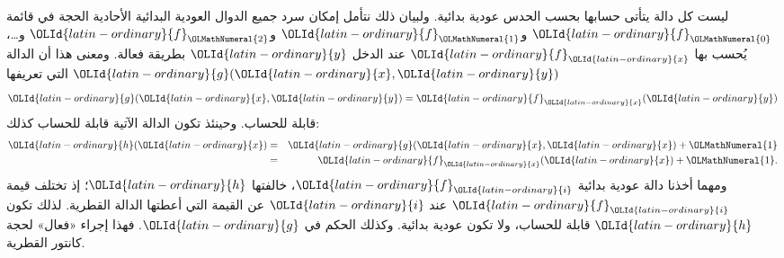\documentclass[../../../include/open-logic-section]{subfiles}
\begin{document}

ليست كل دالة يتأتى حسابها بحسب
الحدس عودية بدائية. ولبيان ذلك نتأمل إمكان سرد جميع الدوال
العودية البدائية الأحادية الحجة في قائمة ${\OLId{latin-ordinary}{f}}_{\OLMathNumeral{0}}$ و${\OLId{latin-ordinary}{f}}_{\OLMathNumeral{1}}$ و${\OLId{latin-ordinary}{f}}_{\OLMathNumeral{2}}$ و…،
يُحسب بها ${\OLId{latin-ordinary}{f}}_{\OLId{latin-ordinary}{x}}$ عند الدخل ${\OLId{latin-ordinary}{y}}$ بطريقة فعالة. ومعنى هذا
أن الدالة ${\OLId{latin-ordinary}{g}}({\OLId{latin-ordinary}{x}},{\OLId{latin-ordinary}{y}})$ التي تعريفها
\[
{\OLId{latin-ordinary}{g}}({\OLId{latin-ordinary}{x}},{\OLId{latin-ordinary}{y}}) = {\OLId{latin-ordinary}{f}}_{\OLId{latin-ordinary}{x}}({\OLId{latin-ordinary}{y}})
\]
قابلة للحساب. وحينئذ تكون الدالة الآتية قابلة للحساب كذلك:
\begin{eqnarray*}
{\OLId{latin-ordinary}{h}}({\OLId{latin-ordinary}{x}}) & = & {\OLId{latin-ordinary}{g}}({\OLId{latin-ordinary}{x}},{\OLId{latin-ordinary}{x}}) + {\OLMathNumeral{1}} \\
& = & {\OLId{latin-ordinary}{f}}_{\OLId{latin-ordinary}{x}}({\OLId{latin-ordinary}{x}}) +{\OLMathNumeral{1}}.
\end{eqnarray*}
ومهما أخذنا دالة عودية بدائية ${\OLId{latin-ordinary}{f}}_{\OLId{latin-ordinary}{i}}$، خالفتها ${\OLId{latin-ordinary}{h}}$؛ إذ تختلف قيمة ${\OLId{latin-ordinary}{f}}_{\OLId{latin-ordinary}{i}}$ عند ${\OLId{latin-ordinary}{i}}$ عن القيمة التي أعطتها الدالة القطرية. لذلك
تكون ${\OLId{latin-ordinary}{h}}$ قابلة للحساب، ولا تكون عودية بدائية. وكذلك الحكم
في ${\OLId{latin-ordinary}{g}}$. فهذا إجراء «فعال» لحجة كانتور القطرية.
\end{document}
